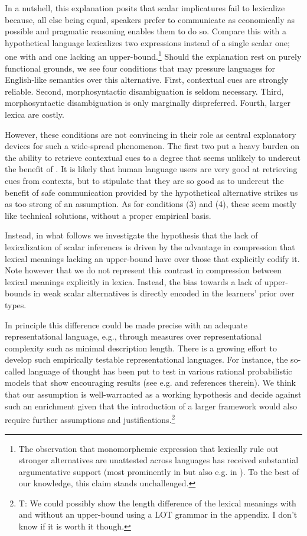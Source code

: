 \documentclass[a4paper]{article}
\newcommand{\hl}[1]{\textcolor[rgb]{.8,.33,.0}{#1}}%
\begin{document}
In a nutshell, this explanation posits that scalar implicatures fail to lexicalize because, all else being equal, speakers prefer to communicate as economically as possible and pragmatic reasoning enables them to do so. Compare this with a hypothetical language lexicalizes two expressions instead of a single scalar one; one with and one lacking an upper-bound.\footnote{The observation that monomorphemic expression that lexically rule out stronger alternatives are unattested across languages has received substantial argumentative support (most prominently in \citealt[252-267]{horn:1984} but also e.g. in \citealt{horn:1972,traugott:2004,vdAuwera:2010}). To the best of our knowledge, this claim stands unchallenged.} Should the explanation rest on purely functional grounds, we see four conditions that may pressure languages for English-like semantics over this alternative. First, contextual cues are strongly reliable. Second, morphosyntactic disambiguation is seldom necessary. Third, morphosyntactic disambiguation is only marginally dispreferred. Fourth, larger lexica are costly. 

However, these conditions are not convincing in their role as central explanatory devices for such a wide-spread phenomenon. The first two put a heavy burden on the ability to retrieve contextual cues to a degree that seems unlikely to undercut the benefit of . It is likely that human language users are very good at retrieving cues from contexts, but to stipulate that they are so good as to undercut the benefit of safe communication provided by the hypothetical alternative strikes us as too strong of an assumption.  As for conditions (3) and (4), these seem mostly like technical solutions, without a proper empirical basis. 

Instead, in what follows we investigate the hypothesis that the lack of lexicalization of scalar inferences is driven by the advantage in compression that lexical meanings lacking an upper-bound have over those that explicitly codify it. Note however that we do not represent this contrast in compression between lexical meanings explicitly in lexica. Instead, the bias towards a lack of upper-bounds in weak scalar alternatives is directly encoded in the learners' prior over types.

 In principle this difference could be made precise with an adequate representational language, e.g., through measures over representational complexity such as minimal description length.  There is a growing effort to develop such empirically  testable  representational  languages. For  instance, the so-called language of thought has been put to test in various rational probabilistic models that show encouraging results (see e.g. \citealt{katz+etal:2008, piantadosi+etal:underreview, piantadosi+etal:2012} and references therein). We think that our assumption is well-warranted as a working hypothesis and decide against such an enrichment given that the introduction of a larger framework would also require further assumptions and justifications.\footnote{\hl{T: We could possibly show the length difference of the lexical meanings with and without an upper-bound using a LOT grammar in the appendix. I don't know if it is worth it though.}}
\end{document}
